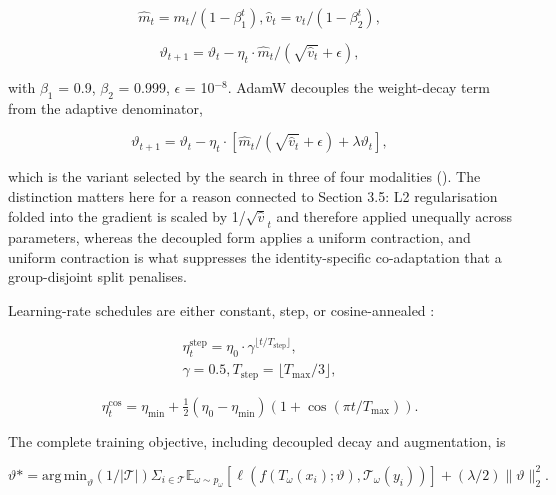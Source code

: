 \begin{equation}
\label{eq:94}
\hat{m}_t = m_t / (1 - \beta _{1}^t), \hat{v}_t = v_t / (1 - \beta _{2}^t),
\end{equation}

\begin{equation}
\label{eq:95}
\vartheta _{t+1} = \vartheta _t - \eta _t \cdot \hat{m}_t / ( \sqrt{\hat{v}_t} + \epsilon ) ,
\end{equation}

with $\beta_{1}$ = 0.9, $\beta_{2}$ = 0.999, $\epsilon$ = 10$^{-8}$. AdamW  decouples the weight-decay term from the adaptive denominator,

\begin{equation}
\label{eq:96}
\vartheta _{t+1} = \vartheta _t - \eta _t \cdot [ \hat{m}_t / ( \sqrt{\hat{v}_t} + \epsilon ) + \lambda \vartheta _t ] ,
\end{equation}

which is the variant selected by the search in three of four modalities (). The distinction matters here for a reason connected to Section 3.5: L2 regularisation folded into the gradient is scaled by 1/$\surd\hat{v}_{t}$ and therefore applied unequally across parameters, whereas the decoupled form  applies a uniform contraction, and uniform contraction is what suppresses the identity-specific co-adaptation that a group-disjoint split penalises.

Learning-rate schedules are either constant, step, or cosine-annealed :

\begin{equation}
\label{eq:97}
\begin{aligned}
\eta _t^{\mathrm{step}} = \eta _{0} \cdot \gamma ^{\lfloor t / T_{\mathrm{step}} \rfloor }, \\
\gamma = 0.5, T_{\mathrm{step}} = \lfloor T_{\mathrm{max}}/3 \rfloor ,
\end{aligned}
\end{equation}

\begin{equation}
\label{eq:98}
\eta _t^{\mathrm{\cos}} = \eta _{\mathrm{min}} + \tfrac{1}{2} ( \eta _{0} - \eta _{\mathrm{min}} ) ( 1 + \cos( \pi t / T_{\mathrm{max}} ) ).
\end{equation}

The complete training objective, including decoupled decay and augmentation, is

\begin{equation}
\label{eq:99}
\vartheta * = \mathrm{arg\,\mathrm{min}}_{\vartheta} (1/|\mathcal{T}|) \Sigma _{i \in \mathcal{T}} \mathbb{E}_{\omega \sim p_{\omega} } [ \ell ( f(T_{\omega} (x_{i}) ; \vartheta ), \mathcal{T}_{\omega} (y_{i}) ) ] + (\lambda /2) \|\vartheta \|_{2}^{2} .
\end{equation}

